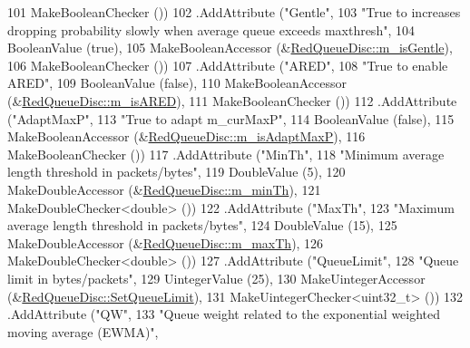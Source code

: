 \begin{DoxyCode}
101                    MakeBooleanChecker ())
102     .AddAttribute (\textcolor{stringliteral}{"Gentle"},
103                    \textcolor{stringliteral}{"True to increases dropping probability slowly when average queue exceeds maxthresh"},
104                    BooleanValue (\textcolor{keyword}{true}),
105                    MakeBooleanAccessor (&\hyperlink{classns3_1_1RedQueueDisc_ad9c91813fb21151ac137681a2b1fb0c8}{RedQueueDisc::m\_isGentle}),
106                    MakeBooleanChecker ())
107     .AddAttribute (\textcolor{stringliteral}{"ARED"},
108                    \textcolor{stringliteral}{"True to enable ARED"},
109                    BooleanValue (\textcolor{keyword}{false}),
110                    MakeBooleanAccessor (&\hyperlink{classns3_1_1RedQueueDisc_a27b33901dccd8e52d8cbe9798ea70139}{RedQueueDisc::m\_isARED}),
111                    MakeBooleanChecker ())
112     .AddAttribute (\textcolor{stringliteral}{"AdaptMaxP"},
113                    \textcolor{stringliteral}{"True to adapt m\_curMaxP"},
114                    BooleanValue (\textcolor{keyword}{false}),
115                    MakeBooleanAccessor (&\hyperlink{classns3_1_1RedQueueDisc_a1bb942ecdce8c8c2eb9953f67ae9a0da}{RedQueueDisc::m\_isAdaptMaxP}),
116                    MakeBooleanChecker ())
117     .AddAttribute (\textcolor{stringliteral}{"MinTh"},
118                    \textcolor{stringliteral}{"Minimum average length threshold in packets/bytes"},
119                    DoubleValue (5),
120                    MakeDoubleAccessor (&\hyperlink{classns3_1_1RedQueueDisc_a6c2f13710a589ca7a43e06d16bd889ee}{RedQueueDisc::m\_minTh}),
121                    MakeDoubleChecker<double> ())
122     .AddAttribute (\textcolor{stringliteral}{"MaxTh"},
123                    \textcolor{stringliteral}{"Maximum average length threshold in packets/bytes"},
124                    DoubleValue (15),
125                    MakeDoubleAccessor (&\hyperlink{classns3_1_1RedQueueDisc_a631761d4c950b0408ba26f42a0509c42}{RedQueueDisc::m\_maxTh}),
126                    MakeDoubleChecker<double> ())
127     .AddAttribute (\textcolor{stringliteral}{"QueueLimit"},
128                    \textcolor{stringliteral}{"Queue limit in bytes/packets"},
129                    UintegerValue (25),
130                    MakeUintegerAccessor (&\hyperlink{classns3_1_1RedQueueDisc_ab5348f5a688d4dff0602654f79d87477}{RedQueueDisc::SetQueueLimit}),
131                    MakeUintegerChecker<uint32\_t> ())
132     .AddAttribute (\textcolor{stringliteral}{"QW"},
133                    \textcolor{stringliteral}{"Queue weight related to the exponential weighted moving average (EWMA)"},

\end{DoxyCode}
